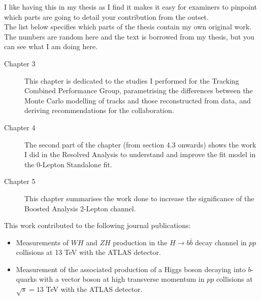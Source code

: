 \documentclass[12pt,titlepage,oneside]{book}
\newcommand{\tcg}[1]{\textcolor{GRASSGREEN}{#1}} %
\begin{document}
\tcg{I like having this in my thesis as I find it makes it easy for examiners to pinpoint which parts are going to detail your contribution from the outset.}\\

The list below specifies which parts of the thesis contain my own original work. \tcg{The numbers are random here and the text is borrowed from my thesis, but you can see what I am doing here.}\\
\begin{description}
\item[Chapter 3] This chapter is dedicated to the studies I performed for the Tracking Combined Performance Group, parametrising the differences between the Monte Carlo modelling of tracks and those reconstructed from data, and deriving recommendations for the collaboration.
\item[Chapter 4] The second part of the chapter (from section 4.3 onwards) shows the work I did in the Resolved Analysis to understand and improve the fit model in the 0-Lepton Standalone fit.\smallskip
\item[Chapter 5] This chapter summarises the work done to increase the significance of the Boosted Analysis 2-Lepton channel.
\end{description}

This work contributed to the following journal publications:
\begin{itemize}
\item[\cite{STXS2020Paper}] Measurements of $WH$ and $ZH$ production in the $H \rightarrow b\bar{b}$ decay channel in $pp$ collisions at 13 TeV with the ATLAS detector.
\item[\cite{Boosted2020Paper}] Measurement of the associated production of a Higgs boson decaying into $b$-quarks with a vector boson at high transverse momentum in $pp$ collisions at $\sqrt{s} = 13$ TeV with the ATLAS detector.
\end{itemize} 

\doublespacing

\mainmatter %
\linenumbers %

\end{document}
